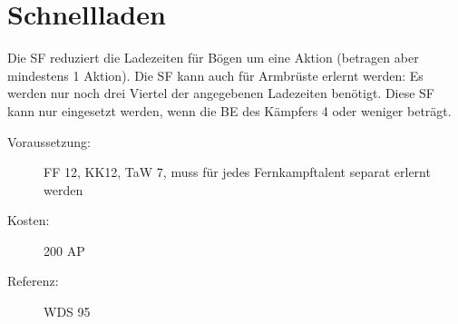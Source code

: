 \section{Schnellladen}
\label{sf.schnellladen}
Die SF  reduziert die Ladezeiten für Bögen um eine Aktion (betragen aber mindestens 1 Aktion).
Die SF kann auch für Armbrüste erlernt werden: Es werden nur noch drei Viertel der angegebenen Ladezeiten benötigt.
Diese SF kann nur eingesetzt werden, wenn die BE des Kämpfers 4 oder weniger beträgt.
\begin{description}
    \item[Voraussetzung:]
        FF 12, KK12, TaW  7, muss für jedes Fernkampftalent separat erlernt werden
    \item [Kosten:]
        200 AP
    \item [Referenz:]
        WDS 95
\end{description}
